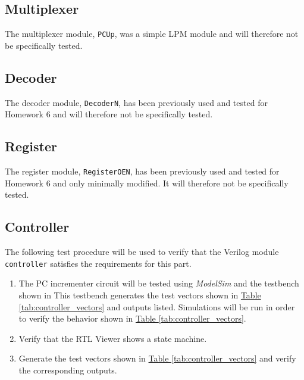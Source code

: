 \subsection{Multiplexer} %
\label{sub:multiplexer}

The multiplexer module, \verb|PCUp|, was a simple LPM module and will therefore not be specifically tested.


\subsection{Decoder} %
\label{sub:decoder}

The decoder module, \verb|DecoderN|, has been previously used and tested for Homework 6 and will therefore not be specifically tested.

\subsection{Register} %
\label{sub:register}

The register module, \verb|RegisterOEN|, has been previously used and tested for Homework 6 and only minimally modified.
It will therefore not be specifically tested.

\subsection{Controller} %
\label{sub:controller}

The following test procedure will be used to verify that the Verilog module \verb|controller| satisfies the requirements for this part.

\begin{enumerate}
    \item The PC incrementer circuit will be tested using \emph{ModelSim} and the testbench shown in %
    This testbench generates the test vectors shown in \hyperref[tab:controller_vectors]{Table \ref*{tab:controller_vectors}} and outputs listed.
    Simulations will be run in order to verify the behavior shown in \hyperref[tab:controller_vectors]{Table \ref*{tab:controller_vectors}}.
    \item Verify that the RTL Viewer shows a state machine.
    \item Generate the test vectors shown in \hyperref[tab:controller_vectors]{Table \ref*{tab:controller_vectors}} and verify the corresponding outputs.
\end{enumerate}

